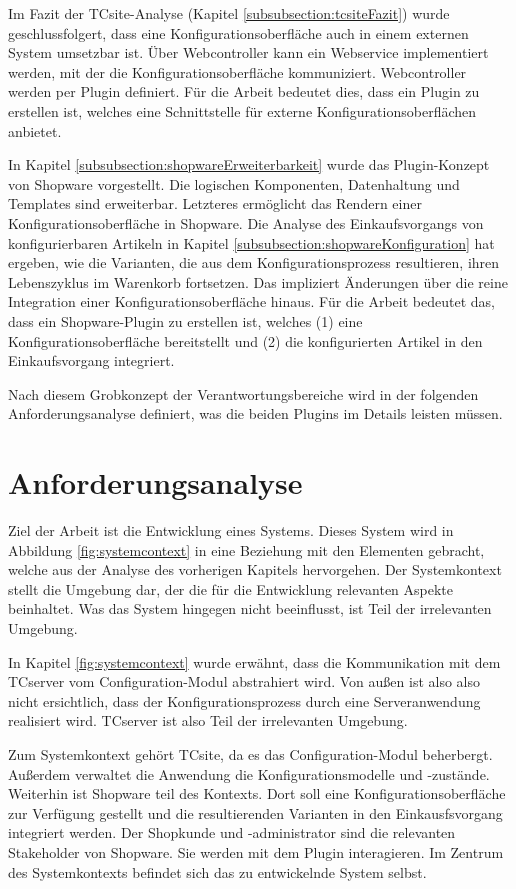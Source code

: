 \documentclass[12pt,a4paper,bibliography=totocnumbered,listof=totoc]{scrartcl}
\begin{document}
Im Fazit der TCsite-Analyse (Kapitel \ref{subsubsection:tcsiteFazit}) wurde
geschlussfolgert, dass eine Konfigurationsoberfläche auch in einem externen System umsetzbar ist. Über Webcontroller kann ein Webservice implementiert werden, mit der die Konfigurationsoberfläche kommuniziert. Webcontroller werden per Plugin definiert. Für die Arbeit bedeutet dies, dass ein Plugin zu erstellen ist, welches eine Schnittstelle für externe Konfigurationsoberflächen anbietet.

In Kapitel \ref{subsubsection:shopwareErweiterbarkeit} wurde das Plugin-Konzept von Shopware vorgestellt. Die logischen Komponenten, Datenhaltung und Templates sind erweiterbar. Letzteres ermöglicht das Rendern einer Konfigurationsoberfläche in Shopware. Die Analyse des Einkaufsvorgangs von konfigurierbaren Artikeln in Kapitel \ref{subsubsection:shopwareKonfiguration} hat ergeben, wie die Varianten, die aus dem Konfigurationsprozess resultieren, ihren Lebenszyklus im Warenkorb fortsetzen. Das impliziert Änderungen über die reine Integration einer Konfigurationsoberfläche hinaus. Für die Arbeit bedeutet das, dass ein Shopware-Plugin zu erstellen ist, welches (1) eine Konfigurationsoberfläche bereitstellt und (2) die konfigurierten Artikel in den Einkaufsvorgang integriert.

Nach diesem Grobkonzept der Verantwortungsbereiche wird in der folgenden Anforderungsanalyse definiert, was die beiden Plugins im Details leisten müssen.
\pagebreak

\section{Anforderungsanalyse}
Ziel der Arbeit ist die Entwicklung eines Systems. Dieses System wird in Abbildung \ref{fig:systemcontext} in eine Beziehung mit den Elementen gebracht, welche aus der Analyse des vorherigen Kapitels hervorgehen. Der Systemkontext stellt die Umgebung dar, der die für die Entwicklung relevanten Aspekte beinhaltet. Was das System hingegen nicht beeinflusst, ist Teil der irrelevanten Umgebung.

In Kapitel \ref{fig:systemcontext} wurde erwähnt, dass die Kommunikation mit dem TCserver vom Configuration-Modul abstrahiert wird. Von außen ist also also nicht ersichtlich, dass der Konfigurationsprozess durch eine Serveranwendung realisiert wird. TCserver ist also Teil der irrelevanten Umgebung.

Zum Systemkontext gehört TCsite, da es das Configuration-Modul beherbergt. Außerdem verwaltet die Anwendung die Konfigurationsmodelle und -zustände. Weiterhin ist Shopware teil des Kontexts. Dort soll eine Konfigurationsoberfläche zur Verfügung gestellt und die resultierenden Varianten in den Einkausfsvorgang integriert werden. Der Shopkunde und -administrator sind die relevanten Stakeholder von Shopware. Sie werden mit dem Plugin interagieren.
Im Zentrum des Systemkontexts befindet sich das zu entwickelnde System selbst.
\end{document}
